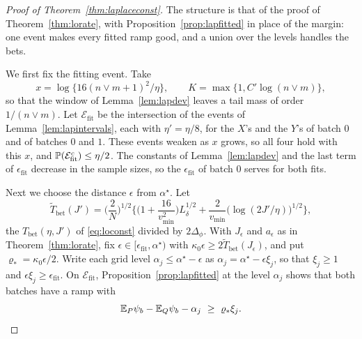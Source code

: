 \begin{proof}[Proof of Theorem~\ref{thm:laplaceconst}]
The structure is that of the proof of Theorem~\ref{thm:lorate}, with Proposition~\ref{prop:lapfitted} in place of the
margin: one event makes every fitted ramp good, and a union over the levels handles the bets.

We first fix the fitting event. Take
\[
x=\log\{16(n\vee m+1)^2/\eta\},\qquad K=\max\{1,C'\log(n\vee m)\},
\]
so that the window of Lemma~\ref{lem:lapdev} leaves a tail mass of order $1/(n\vee m)$. Let $\mathcal E_{\mathrm{fit}}$
be the intersection of the events of Lemma~\ref{lem:lapintervals}, each with $\eta'=\eta/8$, for the $X$'s and the
$Y$'s of batch $0$ and of batches $0$ and $1$. These events weaken as $x$ grows, so all four hold with this $x$, and
$\mathbb{P}(\mathcal E_{\mathrm{fit}}^c)\le\eta/2$. The constants of Lemma~\ref{lem:lapdev} and the last term of
$\epsilon_{\mathrm{fit}}$ decrease in the sample sizes, so the $\epsilon_{\mathrm{fit}}$ of batch $0$ serves for both
fits.

Next we choose the distance $\epsilon$ from $\alpha^\star$. Let
\[
\widetilde T_{\mathrm{bet}}(J')=\Big(\frac2N\Big)^{1/2}\Big\{\Big(1+\frac{16}{v^2_{\min}}\Big)L_\delta^{1/2}
+\frac2{v_{\min}}\big(\log(2J'/\eta)\big)^{1/2}\Big\},
\]
the $T_{\mathrm{bet}}(\eta,J')$ of \eqref{eq:loconst} divided by $2\Delta_\phi$. With $J_\epsilon$ and $a_\epsilon$ as in
Theorem~\ref{thm:lorate}, fix $\epsilon\in[\epsilon_{\mathrm{fit}},\alpha^\star)$ with
$\kappa_0\epsilon\ge2\widetilde T_{\mathrm{bet}}(J_\epsilon)$, and put $\varrho_\ast=\kappa_0\epsilon/2$. Write each grid
level $\alpha_j\le\alpha^\star-\epsilon$ as $\alpha_j=\alpha^\star-\epsilon\xi_j$, so that $\xi_j\ge1$ and
$\epsilon\xi_j\ge\epsilon_{\mathrm{fit}}$. On $\mathcal E_{\mathrm{fit}}$, Proposition~\ref{prop:lapfitted} at the level
$\alpha_j$ shows that both batches have a ramp with
\[
\E_P\rp_b-\E_Q\rp_b-\alpha_j\ \ge\ \varrho_\ast\xi_j .
\]


\end{proof}
